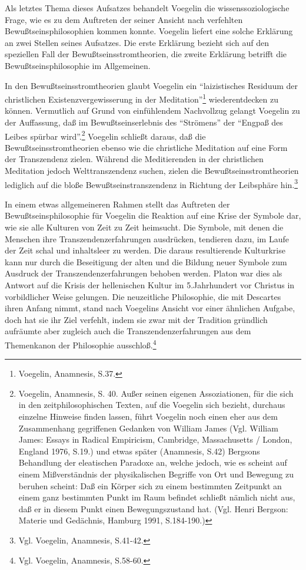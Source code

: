 Als letztes Thema dieses Aufsatzes behandelt Voegelin die wissenssoziologische
Frage, wie es zu dem Auftreten der seiner Ansicht nach verfehlten
Bewußtseinsphilosophien kommen konnte. Voegelin liefert eine solche Erklärung
an zwei Stellen seines Aufsatzes. Die erste Erklärung bezieht sich auf den
speziellen Fall der Bewußtseinsstromtheorien, die zweite Erklärung betrifft
die Bewußtseinsphilosophie im Allgemeinen.

In den Bewußtseinsstromtheorien glaubt Voegelin ein "`laizistisches
Residuum der christlichen Existenzvergewisserung in der
Meditation"'\footnote{Voegelin, Anamnesis, S.37.} wiederentdecken zu
können. Vermutlich auf Grund von einfühlendem Nachvollzug gelangt
Voegelin zu der Auffassung, daß im Bewußtseinserlebnis des "`Strömens"'
der "`Engpaß des Leibes spürbar wird"'.\footnote{Voegelin, Anamnesis, S.
  40. Außer seinen eigenen Assoziationen, für die sich in den
  zeitphilosophischen Texten, auf die Voegelin sich bezieht, durchaus
  einzelne Hinweise finden lassen, führt Voegelin noch einen eher aus
  dem Zusammenhang gegriffenen Gedanken von William James (Vgl. William
  James: Essays in Radical Empiricism, Cambridge, Massachusetts /
  London, England 1976, S.19.) und etwas später (Anamnesis, S.42)
  Bergsons Behandlung der eleatischen Paradoxe an, welche jedoch, wie es
  scheint auf einem Mißverständnis der physikalischen Begriffe von Ort
  und Bewegung zu beruhen scheint: Daß ein Körper sich zu einem
  bestimmten Zeitpunkt an einem ganz bestimmten Punkt im Raum befindet
  schließt nämlich nicht aus, daß er in diesem Punkt einen
  Bewegungszustand hat.  (Vgl. Henri Bergson: Materie und Gedächnis,
  Hamburg 1991, S.184-190.)}  Voegelin schließt daraus, daß die
Bewußtseinsstromtheorien ebenso wie die christliche Meditation auf eine
Form der Transzendenz zielen.  Während die Meditierenden in der
christlichen Meditation jedoch Welttranszendenz suchen, zielen die
Bewußtseinsstromtheorien lediglich auf die bloße Bewußtseinstranszendenz
in Richtung der Leibsphäre hin.\footnote{Vgl. Voegelin, Anamnesis,
  S.41-42.}

In einem etwas allgemeineren Rahmen stellt das Auftreten der
Bewußtseinsphilosophie für Voegelin die Reaktion auf eine Krise der Symbole
dar, wie sie alle Kulturen von Zeit zu Zeit heimsucht. Die Symbole, mit denen
die Menschen ihre Transzendenzerfahrungen ausdrücken, tendieren dazu, im Laufe
der Zeit schal und inhaltsleer zu werden. Die daraus resultierende Kulturkrise
kann nur durch die Beseitigung der alten und die Bildung neuer Symbole zum
Ausdruck der Transzendenzerfahrungen behoben werden. Platon war dies als
Antwort auf die Krisis der hellenischen Kultur im 5.Jahrhundert vor Christus
in vorbildlicher Weise gelungen. Die neuzeitliche Philosophie, die mit
Descartes ihren Anfang nimmt, stand nach Voegelins Ansicht vor einer ähnlichen
Aufgabe, doch hat sie ihr Ziel verfehlt, indem sie zwar mit der Tradition
gründlich aufräumte aber zugleich auch die Transzendenzerfahrungen aus dem
Themenkanon der Philosophie ausschloß.\footnote{Vgl. Voegelin, Anamnesis,
  S.58-60.}

